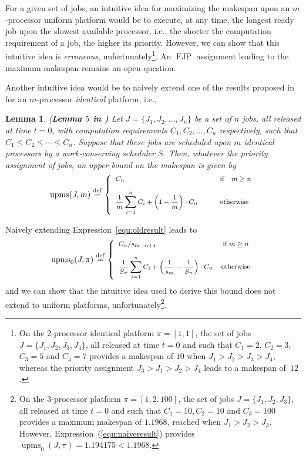 \documentclass[10pt,english,a4paper]{article}
\newcommand{\ds}{\displaystyle}
\newcommand{\equals}{\stackrel{\mathrm{def}}{=}}
\newtheorem{lemma}{Lemma}
\newtheorem{validity test}{Validity Test}
\newcommand{\upms}{\operatorname{upms}}
\newcommand{\FJP}{\operatorname{FJP}}
\begin{document}
For a given set of jobs, an intuitive idea for maximizing the makespan upon an $m$-processor uniform platform would be to execute, at any time, the longest ready job upon the slowest available processor, i.e., the shorter the computation requirement of a job, the higher its priority. However, we can show that this intuitive idea is {\em erroneous}, unfortunately\footnote{On the $2$-processor identical platform $\pi = [1, 1]$, the set of jobs $J = \{J_1, J_2, J_3, J_4\}$, all released at time $t = 0$ and such that $C_1= 2$, $C_2 = 3$, $C_3 = 5$ and $C_4 = 7$ provides a makespan of $10$ when $J_1 > J_2 > J_3 > J_4$, whereas the priority assignment $J_3 > J_1 > J_2 > J_4$ leads to a makespan of~$12$.}. An $\FJP$ assignment leading to the maximum makespan remains an open question.

Another intuitive idea would be to naively extend one of the results proposed in~\cite{Nelis1} for an $m$-processor {\em identical} platform, i.e.,
\begin{lemma}\label{upms} {(\bf Lemma $5$ in \cite{Nelis1})} 
Let $J = \{J_1, J_2, \ldots, J_n\}$ be a set of $n$ jobs, all released at time $t = 0$, with computation requirements $C_1, C_2, \ldots, C_n$ respectively, such that $C_1 \le C_2 \le \cdots \le C_n$. Suppose that these jobs are scheduled upon $m$ {\em identical} processors by a work-conserving scheduler $S$. Then, whatever the priority assignment of jobs, an upper bound on the makespan is given by
\begin{equation}
\label{equ:oldresult}
\footnotesize
\upms(J,m) \equals
  \left\{
          \begin{array}{ll}
	 C_n  & \quad \mathrm{if}\quad m \ge n \\ \\
          \ds\frac{1}{m} \ds\sum_{i=1}^{n}C_i + \left(1 - \ds\frac{1}{m}\right) \cdot C_n \quad & \quad \mathrm{otherwise}         	
          \end{array}
 \right.
\end{equation}
\end{lemma}
Naively extending Expression~\ref{equ:oldresult} leads to
\begin{equation}
\label{equ:naiveresult}
\footnotesize
\upms_0(J, \pi) \equals
  \left\{
          \begin{array}{ll}
	   C_n \slash s_{m-n+1}  & \:  \mathrm{if}\: m \ge n \\ \\
          \ds\frac{1}{S_\pi} \ds\sum_{i=1}^{n}C_i + \left(\ds\frac{1}{s_m} - \ds\frac{1}{S_\pi}\right) \cdot C_n  & \mathrm{otherwise}        
          \end{array}
 \right.
\end{equation}
and we can show that the intuitive idea used to derive this bound does not extend to uniform platforms, unfortunately\footnote{On the $3$-processor platform $\pi = [1, 2, 100]$, the set of jobs $J = \{J_1, J_2, J_3\}$, all released at time $t = 0$ and such that $C_1= 10, C_2 = 10$ and $C_3 = 100$ provides a maximum makespan of $1.1968$, reached when $J_1 > J_2 > J_3$. However, Expression~(\ref{equ:naiveresult}) provides $\upms_0(J, \pi) = 1.194175 <  1.1968$.}.
\end{document}
